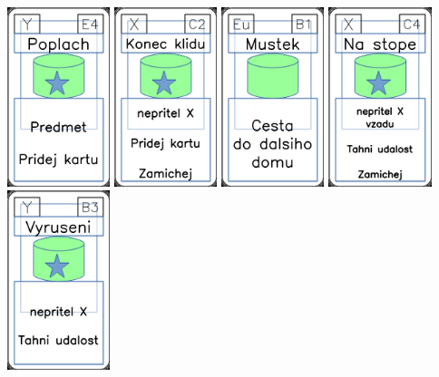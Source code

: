 \documentclass[a4paper]{article}
\begin{document}
	\includegraphics[width=3.0cm]{img-5_23}
	\includegraphics[width=3.0cm]{img-5_11}
	\includegraphics[width=3.0cm]{img-4_35}
	\includegraphics[width=3.0cm]{img-5_13}
	\includegraphics[width=3.0cm]{img-5_37}
\end{document}
